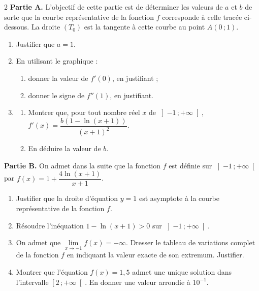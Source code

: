 \documentclass[a4paper,10pt]{article}
\makeatletter
\newcommand{\lycee@repere}[4]{%
  \draw[grille,step=1] (#1,#2) grid (#3,#4);
  \draw[-{Stealth[length=2mm]},thick] (#1,0)--({#3+0.4},0) node[below left=-1pt]{$x$};
  \draw[-{Stealth[length=2mm]},thick] (0,#2)--(0,{#4+0.4}) node[below left=-1pt]{$y$};
  \node[below left,font=\scriptsize,inner sep=1.5pt] at (0,0) {$0$};}
\newcommand{\lycee@gradx}[1]{\foreach \k/\l in {#1}{%
  \draw (\k,0.07)--(\k,-0.07) node[below,font=\scriptsize,inner sep=1.5pt]{$\l$};}}
\newcommand{\lycee@grady}[1]{\foreach \k/\l in {#1}{%
  \draw (0.07,\k)--(-0.07,\k) node[left,font=\scriptsize,inner sep=1.5pt]{$\l$};}}
\newcommand{\lycee@intfo}[2]{\left[#1\,;#2\right[}
\newcommand{\lycee@intoo}[2]{\left]#1\,;#2\right[}
\providecommand{\repere}{\lycee@repere}%
\providecommand{\gradx}{\lycee@gradx}%
\providecommand{\grady}{\lycee@grady}%
\providecommand{\intfo}{\lycee@intfo}%
\providecommand{\intoo}{\lycee@intoo}%
\renewenvironment{center}{\par\addvspace{3pt}\centering}{\par\addvspace{3pt}}
\makeatother
\begin{document}
\begin{multicols}{2}
\smallskip
\textbf{Partie A.} L'objectif de cette partie est de déterminer les valeurs de $a$ et
$b$ de sorte que la courbe représentative de la fonction $f$ corresponde à celle tracée
ci-dessous. La droite $(T_{0})$ est la tangente à cette courbe au point $A(0\,;1)$.
\begin{center}
\end{center}
\begin{enumerate}
  \item Justifier que $a=1$.
  \item En utilisant le graphique :
  \begin{enumerate}[label=\alph*)]
    \item donner la valeur de $f'(0)$, en justifiant ;
    \item donner le signe de $f''(1)$, en justifiant.
  \end{enumerate}
  \item
  \begin{enumerate}[label=\alph*)]
    \item Montrer que, pour tout nombre réel $x$ de $\intoo{-1}{+\infty}$,
          $f'(x)=\dfrac{b\left(1-\ln(x+1)\right)}{(x+1)^{2}}$.
    \item En déduire la valeur de $b$.
  \end{enumerate}
\end{enumerate}

\textbf{Partie B.} On admet dans la suite que la fonction $f$ est définie sur
$\intoo{-1}{+\infty}$ par $f(x)=1+\dfrac{4\ln(x+1)}{x+1}$.
\begin{enumerate}
  \item Justifier que la droite d'équation $y=1$ est asymptote à la courbe
        représentative de la fonction $f$.
  \item Résoudre l'inéquation $1-\ln(x+1)>0$ sur $\intoo{-1}{+\infty}$.
  \item On admet que $\lim\limits_{x\to-1}f(x)=-\infty$. Dresser le tableau de
        variations complet de la fonction $f$ en indiquant la valeur exacte de son
        extremum. Justifier.
  \item Montrer que l'équation $f(x)=1{,}5$ admet une unique solution dans l'intervalle
        $\intfo{2}{+\infty}$. En donner une valeur arrondie à $10^{-1}$.
\end{enumerate}

\end{multicols}
\end{document}
